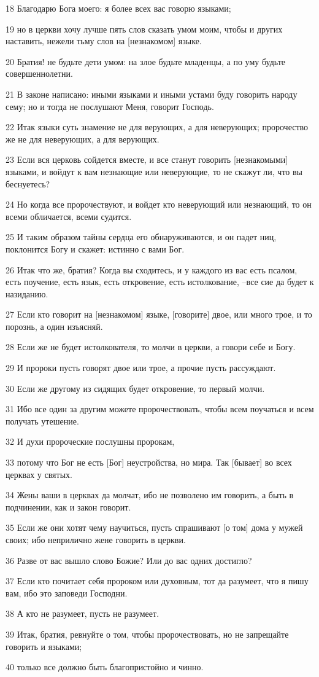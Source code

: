\par 18 Благодарю Бога моего: я более всех вас говорю языками;
\par 19 но в церкви хочу лучше пять слов сказать умом моим, чтобы и других наставить, нежели тьму слов на [незнакомом] языке.
\par 20 Братия! не будьте дети умом: на злое будьте младенцы, а по уму будьте совершеннолетни.
\par 21 В законе написано: иными языками и иными устами буду говорить народу сему; но и тогда не послушают Меня, говорит Господь.
\par 22 Итак языки суть знамение не для верующих, а для неверующих; пророчество же не для неверующих, а для верующих.
\par 23 Если вся церковь сойдется вместе, и все станут говорить [незнакомыми] языками, и войдут к вам незнающие или неверующие, то не скажут ли, что вы беснуетесь?
\par 24 Но когда все пророчествуют, и войдет кто неверующий или незнающий, то он всеми обличается, всеми судится.
\par 25 И таким образом тайны сердца его обнаруживаются, и он падет ниц, поклонится Богу и скажет: истинно с вами Бог.
\par 26 Итак что же, братия? Когда вы сходитесь, и у каждого из вас есть псалом, есть поучение, есть язык, есть откровение, есть истолкование, --все сие да будет к назиданию.
\par 27 Если кто говорит на [незнакомом] языке, [говорите] двое, или много трое, и то порознь, а один изъясняй.
\par 28 Если же не будет истолкователя, то молчи в церкви, а говори себе и Богу.
\par 29 И пророки пусть говорят двое или трое, а прочие пусть рассуждают.
\par 30 Если же другому из сидящих будет откровение, то первый молчи.
\par 31 Ибо все один за другим можете пророчествовать, чтобы всем поучаться и всем получать утешение.
\par 32 И духи пророческие послушны пророкам,
\par 33 потому что Бог не есть [Бог] неустройства, но мира. Так [бывает] во всех церквах у святых.
\par 34 Жены ваши в церквах да молчат, ибо не позволено им говорить, а быть в подчинении, как и закон говорит.
\par 35 Если же они хотят чему научиться, пусть спрашивают [о том] дома у мужей своих; ибо неприлично жене говорить в церкви.
\par 36 Разве от вас вышло слово Божие? Или до вас одних достигло?
\par 37 Если кто почитает себя пророком или духовным, тот да разумеет, что я пишу вам, ибо это заповеди Господни.
\par 38 А кто не разумеет, пусть не разумеет.
\par 39 Итак, братия, ревнуйте о том, чтобы пророчествовать, но не запрещайте говорить и языками;
\par 40 только все должно быть благопристойно и чинно.

